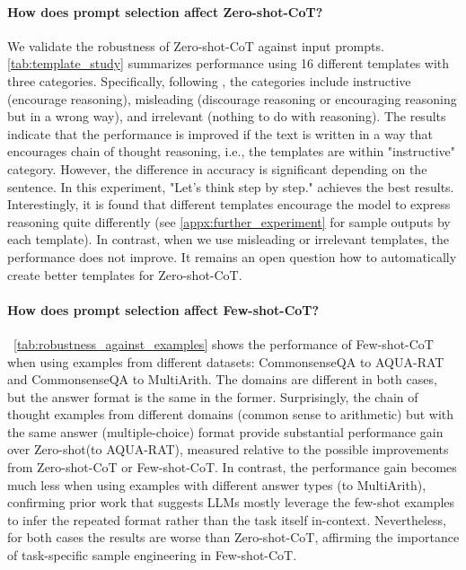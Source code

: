 \documentclass{article}
\newcommand{\CoT}{chain of thought\xspace}
\newcommand{\ours}{Zero-shot-CoT\xspace}
\newcommand{\theirs}{Few-shot-CoT\xspace}
\newcommand{\theirsz}{Zero-shot\xspace}
\begin{document}



\paragraph{How does prompt selection affect \ours?}
We validate the robustness of \ours against input prompts. \autoref{tab:template_study} summarizes performance using 16 different templates with three categories. Specifically, following \citet{websonpavlick2022prompt}, the categories include instructive (encourage reasoning), misleading (discourage reasoning or encouraging reasoning but in a wrong way), and irrelevant (nothing to do with reasoning). The results indicate that the performance is improved if the text is written in a way that encourages \CoT reasoning, i.e., the templates are within "instructive" category. However, the difference in accuracy is significant depending on the sentence. In this experiment, "Let’s think step by step." achieves the best results. Interestingly, it is found that different templates encourage the model to express reasoning quite differently (see \autoref{appx:further_experiment} for sample outputs by each template). In contrast, when we use misleading or irrelevant templates, the performance does not improve. It remains an open question how to automatically create better templates for \ours.


\paragraph{How does prompt selection affect \theirs?}
~\autoref{tab:robustness_against_examples} shows the performance of \theirs when using examples from different datasets: CommonsenseQA to AQUA-RAT and CommonsenseQA to MultiArith. 
The domains are different in both cases, but the answer format is the same in the former. 
Surprisingly, the \CoT examples from different domains (common sense to arithmetic) but with the same answer (multiple-choice) format provide substantial performance gain over \theirsz (to AQUA-RAT), measured relative to the possible improvements from \ours or \theirs. In contrast, the performance gain becomes much less when using examples with different answer types (to MultiArith), confirming prior work \citep{min2022rethinking} that suggests LLMs mostly leverage the few-shot examples to infer the repeated format rather than the task itself in-context. 
Nevertheless, for both cases the results are worse than \ours, affirming the importance of task-specific sample engineering in \theirs.
\end{document}
